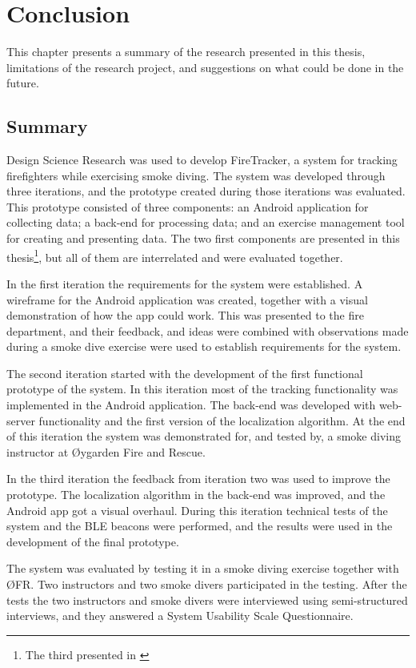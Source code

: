 \documentclass[../Main/thesis.tex]{subfiles}
\begin{document}
\chapter{Conclusion}
\label{ch:conclusion}
This chapter presents a summary of the research presented in this thesis, limitations of the research project, and suggestions on what could be done in the future.

\section{Summary}
Design Science Research was used to develop FireTracker, a system for tracking firefighters while exercising smoke diving.
The system was developed through three iterations, and the prototype created during those iterations was evaluated.
This prototype consisted of three components: an Android application for collecting data; a back-end for processing data; and an exercise management tool for creating and presenting data.
The two first components are presented in this thesis\footnote{The third presented in \citet{Bjorgen2018}}, but all of them are interrelated and were evaluated together.

In the first iteration the requirements for the system were established. 
A wireframe for the Android application was created, together with a visual demonstration of how the app could work.
This was presented to the fire department, and their feedback, and ideas were combined with observations made during a smoke dive exercise were used to establish requirements for the system.

The second iteration started with the development of the first functional prototype of the system.
In this iteration most of the tracking functionality was implemented in the Android application.
The back-end was developed with web-server functionality and the first version of the localization algorithm.
At the end of this iteration the system was demonstrated for, and tested by, a smoke diving instructor at Øygarden Fire and Rescue.


In the third iteration the feedback from iteration two was used to improve the prototype.
The localization algorithm in the back-end was improved, and the Android app got a visual overhaul.
During this iteration technical tests of the system and the BLE beacons were performed, and the results were used in the development of the final prototype.

The system was evaluated by testing it in a smoke diving exercise together with ØFR.
Two instructors and two smoke divers participated in the testing.
After the tests the two instructors and smoke divers were interviewed using semi-structured interviews, and they answered a System Usability Scale Questionnaire.
\end{document}
